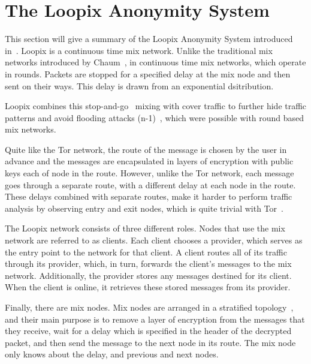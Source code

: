 \documentclass[a4paper,11pt,oneside]{report}
\begin{document}
\section{The Loopix Anonymity System}
\label{sec:loopix}
This section will give a summary of the Loopix Anonymity System introduced in~\cite{loopix}. Loopix is a continuous time mix network. Unlike the traditional mix networks introduced by Chaum~\cite{chaum1981mix}, in continuous time mix networks, which operate in rounds. Packets are stopped for a specified delay at the mix node and then sent on their ways. This delay is drawn from an exponential dsitribution.

Loopix combines this stop-and-go~\cite{stop} mixing with cover traffic to further hide traffic patterns and avoid flooding attacks (n-1)~\cite{flood}, which were possible with round based mix networks.

Quite like the Tor network, the route of the message is chosen by the user in advance and the messages are encapsulated in layers of encryption with public keys each of node in the route. However, unlike the Tor network, each message goes through a separate route, with a different delay at each node in the route. These delays combined with separate routes, make it harder to perform traffic analysis by observing entry and exit nodes, which is quite trivial with Tor~\cite{tor}.

The Loopix network consists of three different roles. Nodes that use the mix network are referred to as clients. Each client chooses a provider, which serves as the entry point to the network for that client. A client routes all of its traffic through its provider, which, in turn, forwards the client’s messages to the mix network. Additionally, the provider stores any messages destined for its client. When the client is online, it retrieves these stored messages from its provider.

Finally, there are mix nodes. Mix nodes are arranged in a stratified topology~\cite{topology}, and their main purpose is to remove a layer of encryption from the messages that they receive, wait for a delay which is specified in the header of the decrypted packet, and then send the message to the next node in its route. The mix node only knows about the delay, and previous and next nodes.
\end{document}
